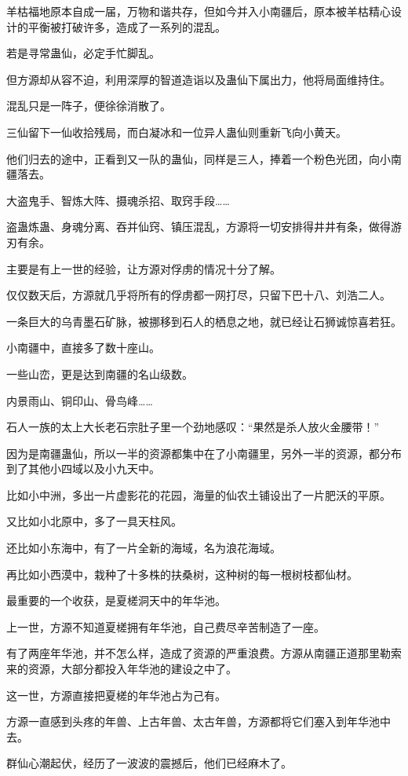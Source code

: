 \begin{this_body}
羊枯福地原本自成一届，万物和谐共存，但如今并入小南疆后，原本被羊枯精心设计的平衡被打破许多，造成了一系列的混乱。

若是寻常蛊仙，必定手忙脚乱。

但方源却从容不迫，利用深厚的智道造诣以及蛊仙下属出力，他将局面维持住。

混乱只是一阵子，便徐徐消散了。

三仙留下一仙收拾残局，而白凝冰和一位异人蛊仙则重新飞向小黄天。

他们归去的途中，正看到又一队的蛊仙，同样是三人，捧着一个粉色光团，向小南疆落去。

大盗鬼手、智炼大阵、摄魂杀招、取窍手段……

盗蛊炼蛊、身魂分离、吞并仙窍、镇压混乱，方源将一切安排得井井有条，做得游刃有余。

主要是有上一世的经验，让方源对俘虏的情况十分了解。

仅仅数天后，方源就几乎将所有的俘虏都一网打尽，只留下巴十八、刘浩二人。

一条巨大的乌青墨石矿脉，被挪移到石人的栖息之地，就已经让石狮诚惊喜若狂。

小南疆中，直接多了数十座山。

一些山峦，更是达到南疆的名山级数。

内景雨山、铜印山、骨鸟峰……

石人一族的太上大长老石宗肚子里一个劲地感叹：“果然是杀人放火金腰带！”

因为是南疆蛊仙，所以一半的资源都集中在了小南疆里，另外一半的资源，都分布到了其他小四域以及小九天中。

比如小中洲，多出一片虚影花的花园，海量的仙农土铺设出了一片肥沃的平原。

又比如小北原中，多了一具天柱风。

还比如小东海中，有了一片全新的海域，名为浪花海域。

再比如小西漠中，栽种了十多株的扶桑树，这种树的每一根树枝都仙材。

最重要的一个收获，是夏槎洞天中的年华池。

上一世，方源不知道夏槎拥有年华池，自己费尽辛苦制造了一座。

有了两座年华池，并不怎么样，造成了资源的严重浪费。方源从南疆正道那里勒索来的资源，大部分都投入年华池的建设之中了。

这一世，方源直接把夏槎的年华池占为己有。

方源一直感到头疼的年兽、上古年兽、太古年兽，方源都将它们塞入到年华池中去。

群仙心潮起伏，经历了一波波的震撼后，他们已经麻木了。


\end{this_body}
